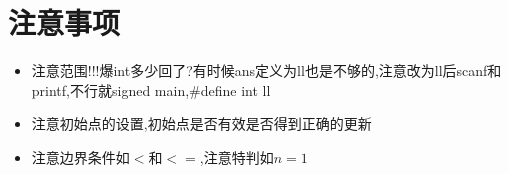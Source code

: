 \documentclass[a4paper,11pt]{article}
\begin{document}

\newpage
\section{注意事项}
\begin{itemize}
    \item 注意范围!!!爆int多少回了?有时候ans定义为ll也是不够的,注意改为ll后scanf和printf,不行就signed main,\#define int ll
    \item 注意初始点的设置,初始点是否有效是否得到正确的更新
    \item 注意边界条件如$<$和$<=$,注意特判如$n=1$
\end{itemize}
\end{document}
